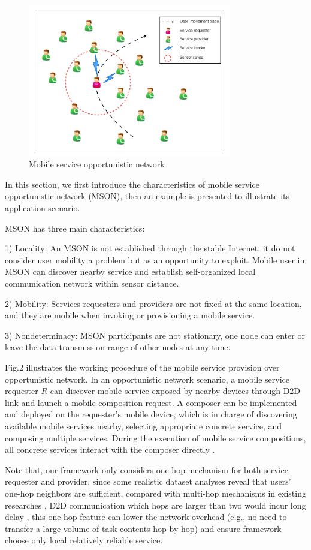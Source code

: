 \documentclass[10pt,journal,compsoc]{IEEEtran}
\begin{document}
\begin{figure}[!t]
\centering
\includegraphics[width=3.5in]{./img/pic2.pdf}
\caption{Mobile service opportunistic network}
\label{fig_mson}
\end{figure}

In this section, we first introduce the characteristics of mobile service opportunistic network (MSON), then an example is presented to illustrate its application scenario.

MSON has three main characteristics:

1) Locality: An MSON is not established through the stable Internet, it do not consider user mobility a problem but as an opportunity to exploit. Mobile user in MSON can discover nearby service and establish self-organized local communication network within sensor distance.

2) Mobility: Services requesters and providers are not fixed at the same location, and they are mobile when invoking or provisioning a mobile service.

3) Nondeterminacy: MSON participants are not stationary, one node can enter or leave the data transmission range of other nodes at any time. 

Fig.2 illustrates the working procedure of the mobile service provision over opportunistic network. In an opportunistic network scenario, a mobile service requester $R$ can discover mobile service exposed by nearby devices through D2D link and launch a mobile composition request. A composer can be implemented and deployed on the requester's mobile device, which is in charge of discovering available mobile services nearby, selecting appropriate concrete service, and composing multiple services. During the execution of mobile service compositions, all concrete services interact with the composer directly \cite{Deng2017}.

Note that, our framework only considers one-hop mechanism for both service requester and provider, since some realistic dataset analyses reveal that users' one-hop neighbors are sufficient, compared with multi-hop mechanisms in existing researches \cite{chang2015progressive,karaliopoulos2015user,han2016competition,tuncay2013participant,wu2013homing,jiang2016exploiting,liu2013exploring}, D2D communication which hops are larger than two would incur long delay \cite{li2014can},  this one-hop feature can lower the network overhead (e.g., no need to transfer a large volume of task contents hop by hop) and ensure framework choose only local relatively reliable service. 
\end{document}
